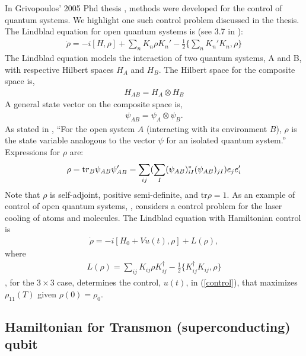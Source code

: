 \documentclass[a4paper,fleqn]{cas-sc}
\begin{document}
In Grivopoulos' 2005 Phd thesis \cite{grivopoulos2005optimal}, methods
were developed for the control of quantum systems.  We 
highlight one such control problem discussed in the thesis. 
The Lindblad equation \cite{manzano2020short,lidar2019lecture} 
for open quantum systems is
(see 3.7 in \cite{grivopoulos2005optimal}):
\begin{eqnarray}
	\dot{\rho}=-i[H,\rho]+
	\sum_{n} K_{n}\rho K_{n}' -\frac{1}{2}
	\{\sum_{n} K_{n}'K_{n},\rho\}
\end{eqnarray}
The Lindblad equation models the interaction of two quantum systems, 
A and B, with respective Hilbert spaces $H_{A}$ and $H_{B}$.  The
Hilbert space for the composite space is,
\begin{eqnarray}
	H_{AB}=H_{A}\otimes H_{B}
\end{eqnarray}
A general state vector on the composite space is,
\begin{eqnarray}
	\psi_{AB}=\psi_{A}\otimes\psi_{B}.
\end{eqnarray}
As stated in 
\cite{grivopoulos2005optimal},
``For the open system $A$ (interacting with its environment $B$), $\rho$ is 
the state variable analogous to the vector $\psi$ for an 
isolated quantum system.'' Expressions for $\rho$ are:
\begin{eqnarray}
	\rho={\mbox tr}_{B}\psi_{AB}\psi_{AB}'=
	\sum_{ij}(\sum_{I}(\psi_{AB})^{\ast}_{iI}
	(\psi_{AB})_{jI})e_{j}e_{i}'
\end{eqnarray}
Note that $\rho$ is self-adjoint, positive semi-definite, and
$\mbox{tr}\rho=1$.  As an example of control of open quantum systems, \cite{grivopoulos2005optimal},
considers a control problem for the laser cooling of atoms and 
molecules. The Lindblad equation with Hamiltonian control is
\begin{eqnarray}
	\dot{\rho}=-i[H_{0}+V u(t),\rho]+L(\rho), \label{control}
\end{eqnarray}
where
\begin{eqnarray}
	L(\rho)=\sum_{ij}K_{ij}\rho K_{ij}^{\dag}-\frac{1}{2}
	\{K_{ij}^{\dag}K_{ij},\rho\}
\end{eqnarray}
\cite{grivopoulos2005optimal}, for the $3\times 3$ case,
determines the control, $u(t)$, in
(\ref{control}), that maximizes $\rho_{11}(T)$ given $\rho(0)=\rho_{0}$.

\subsection{Hamiltonian for Transmon (superconducting) qubit }
\end{document}
